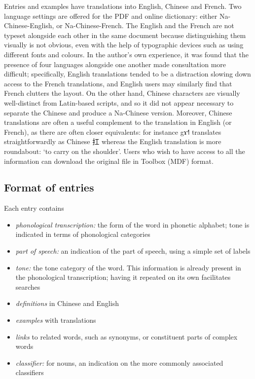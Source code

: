 \documentclass[oldfontcommands,oneside,a4paper,11pt]{article}
\newcommand{\ipa}[1]{{\phon #1}} %
\newcommand{\zh}[1]{{\cn #1}}
\begin{document}
	Entries and examples have translations into English, Chinese and French. Two language settings are offered for the PDF and online dictionary: either Na-Chinese-English, or Na-Chinese-French. The English and the French are not typeset alongside each other in the same document because distinguishing them visually is not obvious, even with the help of typographic devices such as using different fonts and colours. In the author's own experience, it was found that the presence of four languages alongside one another made consultation more difficult; specifically, English translations tended to be a distraction slowing down access to the French translations, and English users may similarly find that French clutters the layout. On the other hand, Chinese characters are visually well-distinct from Latin-based scripts, and so it did not appear necessary to separate the Chinese and produce a Na-Chinese version. Moreover, Chinese translations are often a useful complement to the translation in English (or French), as there are often closer equivalents: for instance \ipa{gɤ˧˥} translates straightforwardly as Chinese \zh{扛} whereas the English translation is more roundabout: ‘to carry on the shoulder'. Users who wish to have access to all the information can download the original file in Toolbox (MDF) format. 
	
	\subsection{Format of entries} \label{sec:entries}
	
	Each entry contains
	\begin{itemize}
		\item \textit{phonological transcription:} the form of the word in phonetic alphabet; tone is indicated in terms of phonological categories
		\item \textit{part of speech:} an indication of the part of speech, using a simple set of labels
		\item \textit{tone:} the tone category of the word. This information is already present in the phonological transcription; having it repeated on its own facilitates searches
		\item \textit{definitions} in Chinese and English
		\item \textit{examples} with translations
		\item \textit{links} to related words, such as synonyms, or constituent parts of complex words 
		\item \textit{classifier:} for nouns, an indication on the more commonly associated classifiers
	\end{itemize}
	
\end{document}
